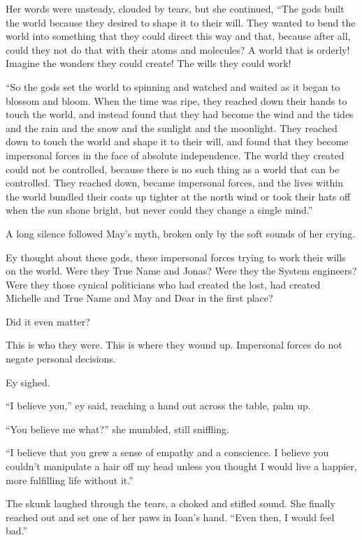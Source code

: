 Her words were unsteady, clouded by tears, but she continued, ``The gods built the world because they desired to shape it to their will. They wanted to bend the world into something that they could direct this way and that, because after all, could they not do that with their atoms and molecules? A world that is orderly! Imagine the wonders they could create! The wills they could work!

``So the gods set the world to spinning and watched and waited as it began to blossom and bloom. When the time was ripe, they reached down their hands to touch the world, and instead found that they had become the wind and the tides and the rain and the snow and the sunlight and the moonlight. They reached down to touch the world and shape it to their will, and found that they become impersonal forces in the face of absolute independence. The world they created could not be controlled, because there is no such thing as a world that can be controlled. They reached down, became impersonal forces, and the lives within the world bundled their coats up tighter at the north wind or took their hats off when the sun shone bright, but never could they change a single mind.''

A long silence followed May's myth, broken only by the soft sounds of her crying.

Ey thought about these gods, these impersonal forces trying to work their wills on the world. Were they True Name and Jonas? Were they the System engineers? Were they those cynical politicians who had created the lost, had created Michelle and True Name and May and Dear in the first place?

Did it even matter?

This is who they were. This is where they wound up. Impersonal forces do not negate personal decisions.

Ey sighed.

``I believe you,'' ey said, reaching a hand out across the table, palm up.

``You believe me what?'' she mumbled, still sniffling.

``I believe that you grew a sense of empathy and a conscience. I believe you couldn't manipulate a hair off my head unless you thought I would live a happier, more fulfilling life without it.''

The skunk laughed through the tears, a choked and stifled sound. She finally reached out and set one of her paws in Ioan's hand. ``Even then, I would feel bad.''

